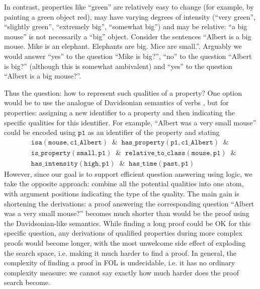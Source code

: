 \documentclass[runningheads]{llncs}
\begin{document}
In contrast, properties like ``green'' are relatively easy to change (for example, by painting a green object red), may have varying degrees
of intensity (``very green'', ``slightly green'', ``extremely big'', ``somewhat big'') and may be relative: ``a big mouse'' is not necessarily
a ``big'' object. Consider the sentences ``Albert is a big mouse. Mike is an elephant. Elephants are big. Mice are small.''.
Arguably we would answer ``yes'' to the question ``Mike is big?'', ``no'' to the question ``Albert is big?'' (although this is 
somewhat ambivalent) and ``yes'' to the question ``Albert is a big mouse?''. 

Thus the question: how to represent such qualities of a property? One option would be to use the analogue of Davidsonian semantics
of verbs \cite{maienborn2011event}, but for properties:
assigning a new identifier to a property and then indicating the specific qualities for this identifier. For example,
``Albert was a very small mouse'' could be encoded using $\mathtt{p1}$ as an identifier of the property and stating
\begin{align*}
  &\mathtt{isa(mouse,c1\_Albert) \; \; \& \; \; has\_property(p1,c1\_Albert) \; \; \& }\\
  &\mathtt{is\_property(small,p1) \; \; \& \; \; relative\_to\_class(mouse,p1) \; \; \& }\\
  &\mathtt{has\_intensity(high,p1) \; \; \& \; \; has\_time(past,p1)}
\end{align*}
However, since our goal is to support efficient question answering using logic, we take the opposite approach: combine all the potential qualities into one atom, with argument positions
indicating the type of the quality. The main gain is shortening the derivations: a proof answering the corresponding question ``Albert was a very small mouse?'' becomes
much shorter than would be the proof using the Davidsonian-like semantics. While finding a long proof could be OK for this specific question, any derivations of qualified
properties during more complex proofs would become longer, with the most unwelcome side effect of exploding the search space, i.e. making it much harder to find a proof.
In general, the complexity of finding a proof in FOL is undecidable, i.e. it has no ordinary complexity measure: we cannot say exactly how much harder does the proof search
become.
\end{document}
